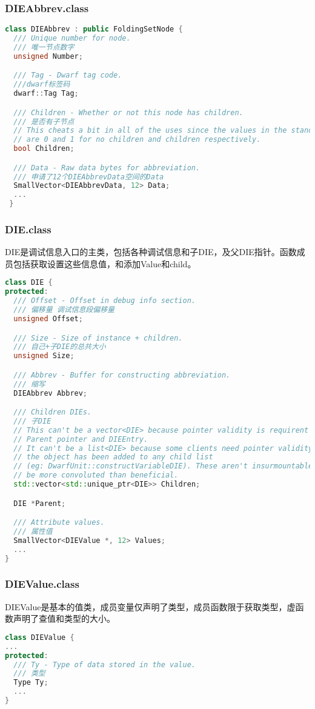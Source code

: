 \documentclass{ctexart}
\begin{document}
\subsubsection{DIEAbbrev.class}
\begin{lstlisting}[language=c++]
class DIEAbbrev : public FoldingSetNode {
  /// Unique number for node.
  /// 唯一节点数字
  unsigned Number;

  /// Tag - Dwarf tag code.
  ///dwarf标签码
  dwarf::Tag Tag;

  /// Children - Whether or not this node has children.
  /// 是否有子节点
  // This cheats a bit in all of the uses since the values in the standard
  // are 0 and 1 for no children and children respectively.
  bool Children;

  /// Data - Raw data bytes for abbreviation.
  /// 申请了12个DIEAbbrevData空间的Data
  SmallVector<DIEAbbrevData, 12> Data;
  ...
 }
\end{lstlisting}

\subsubsection{DIE.class}
DIE是调试信息入口的主类，包括各种调试信息和子DIE，及父DIE指针。函数成员包括获取设置这些信息值，和添加Value和child。
\begin{lstlisting}[language=c++]
class DIE {
protected:
  /// Offset - Offset in debug info section.
  /// 偏移量 调试信息段偏移量
  unsigned Offset;

  /// Size - Size of instance + children.
  /// 自己+子DIE的总共大小
  unsigned Size;

  /// Abbrev - Buffer for constructing abbreviation.
  /// 缩写
  DIEAbbrev Abbrev;

  /// Children DIEs.
  /// 子DIE
  // This can't be a vector<DIE> because pointer validity is requirent for the
  // Parent pointer and DIEEntry.
  // It can't be a list<DIE> because some clients need pointer validity before
  // the object has been added to any child list
  // (eg: DwarfUnit::constructVariableDIE). These aren't insurmountable, but may
  // be more convoluted than beneficial.
  std::vector<std::unique_ptr<DIE>> Children;

  DIE *Parent;

  /// Attribute values.
  /// 属性值
  SmallVector<DIEValue *, 12> Values;
  ...
}
\end{lstlisting}

\subsubsection{DIEValue.class}
DIEValue是基本的值类，成员变量仅声明了类型，成员函数限于获取类型，虚函数声明了查值和类型的大小。
\begin{lstlisting}[language=c++]
class DIEValue {
...
protected:
  /// Ty - Type of data stored in the value.
  /// 类型
  Type Ty;
  ...
}
\end{lstlisting}
\end{document}
